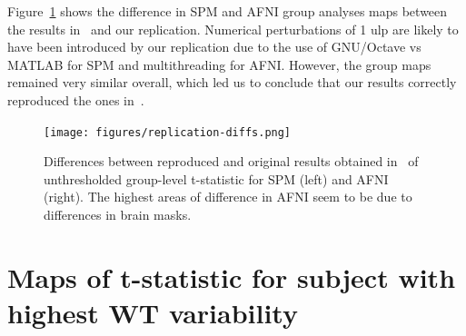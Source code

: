 \documentclass[11pt,onecolumn]{article}
\begin{document}
Figure~\ref{fig:replication-diff} shows the difference in SPM and AFNI
group analyses maps between the results in~\cite{bowring2019exploring} and
our replication. Numerical perturbations of 1 ulp are likely to have been
introduced by our replication due to the use of GNU/Octave vs MATLAB for SPM
and multithreading for AFNI.
  However, the group maps remained very similar
overall, which led us to conclude that our results correctly reproduced
the ones in~\cite{bowring2019exploring}.
\begin{figure}[ht]
  \texttt{[image: figures/replication-diffs.png]}
  \caption{Differences between reproduced and original results obtained in~\cite{bowring2019exploring}
    of unthresholded group-level t-statistic for SPM (left) and AFNI
    (right). The highest areas of difference in AFNI seem to be due to
    differences in brain masks.}
  \label{fig:replication-diff}
\end{figure}




\section{Maps of t-statistic for subject with highest WT variability}
\label{sec:supp-worst-subject}
\end{document}

